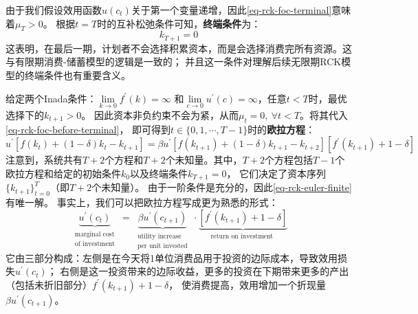 由于我们假设效用函数$u(c_t)$关于第一个变量递增，因此\cref{eq-rck-foc-terminal}意味着$\mu_T>0$。
根据$t=T$时的互补松弛条件可知，\textbf{终端条件}为：
\begin{equation*}
    k_{T+1} = 0
\end{equation*}
这表明，在最后一期，计划者不会选择积累资本，而是会选择消费完所有资源。这与有限期消费-储蓄模型的逻辑是一致的；
并且这一条件对理解后续无限期RCK模型的终端条件也有重要含义。

给定两个Inada条件：$\lim\limits_{k\rightarrow 0}f^{\prime}(k) = \infty$
和$\lim\limits_{c\rightarrow 0}u^{\prime}(c) = \infty$，任意$t<T$时，最优选择下的$k_{t+1}>0$。
因此资本非负约束不会为紧，从而$\mu_t=0,~\forall t< T$。将其代入\cref{eq-rck-foc-before-terminal}，
即可得到$t\in\{0,1,\cdots,T-1\}$时的\textbf{欧拉方程}：
\begin{equation}    \label{eq-rck-euler-finite}
    u^{\prime}\left[f\left(k_t\right)+(1-\delta) k_t-k_{t+1}\right]
        = \beta u^{\prime}\left[f\left(k_{t+1}\right)+(1-\delta) k_{t+1}-k_{t+2}\right]
            \left[f^{\prime}\left(k_{t+1}\right)+1-\delta\right]
\end{equation}
注意到，系统共有$T+2$个方程和$T+2$个未知量。其中，$T+2$个方程包括$T-1$个欧拉方程和给定的初始条件$k_0$以及终端条件$k_{T+1}=0$，
它们决定了资本序列$\{k_{t+1}\}_{t=0}^T$（即$T+2$个未知量）。
由于一阶条件是充分的，因此\cref{eq-rck-euler-finite}有唯一解。
事实上，我们可以把欧拉方程写成更为熟悉的形式：
\begin{equation*}
    \underbrace{u^{\prime}\left(c_t\right)}_
    {\begin{array}{c}
        \text { marginal cost } \\
        \text { of investment }
    \end{array}}
    =\underbrace{\beta u^{\prime}\left(c_{t+1}\right)}_
    {\begin{array}{c}
        \text { utility increase } \\
        \text { per unit invested }
    \end{array}} 
    \cdot \underbrace{\left[f^{\prime}\left(k_{t+1}\right)+1-\delta\right]}_{\text {return on investment }}
\end{equation*}
它由三部分构成：左侧是在今天将1单位消费品用于投资的边际成本，导致效用损失$u^{\prime}(c_t)$；
右侧是这一投资带来的边际收益，更多的投资在下期带来更多的产出（包括未折旧部分）$f^{\prime}(k_{t+1})+1-\delta$，
使消费提高，效用增加一个折现量$\beta u^{\prime}(c_{t+1})$。

